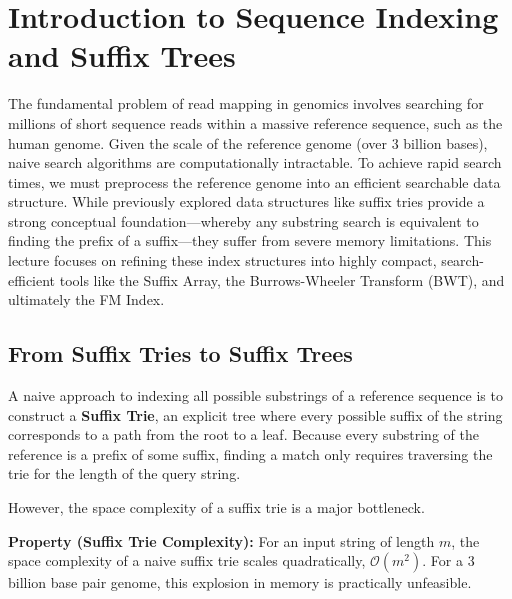 
\section{Introduction to Sequence Indexing and Suffix Trees}

The fundamental problem of read mapping in genomics involves searching for millions of short sequence reads within a massive reference sequence, such as the human genome. Given the scale of the reference genome (over 3 billion bases), naive search algorithms are computationally intractable. To achieve rapid search times, we must preprocess the reference genome into an efficient searchable data structure. While previously explored data structures like suffix tries provide a strong conceptual foundation—whereby any substring search is equivalent to finding the prefix of a suffix—they suffer from severe memory limitations. This lecture focuses on refining these index structures into highly compact, search-efficient tools like the Suffix Array, the Burrows-Wheeler Transform (BWT), and ultimately the FM Index.

\subsection{From Suffix Tries to Suffix Trees}

A naive approach to indexing all possible substrings of a reference sequence is to construct a \textbf{Suffix Trie}, an explicit tree where every possible suffix of the string corresponds to a path from the root to a leaf. Because every substring of the reference is a prefix of some suffix, finding a match only requires traversing the trie for the length of the query string. 

However, the space complexity of a suffix trie is a major bottleneck.
\begin{important}
    \textbf{Property (Suffix Trie Complexity):} For an input string of length \( m \), the space complexity of a naive suffix trie scales quadratically, \( \mathcal{O}(m^2) \). For a 3 billion base pair genome, this explosion in memory is practically unfeasible.
\end{important}

